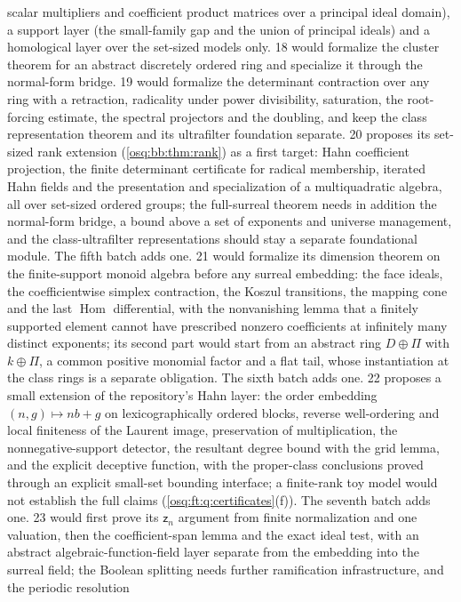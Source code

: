\documentclass[11pt,letterpaper]{article}
\numberwithin{equation}{section}
\theoremstyle{definition}
\theoremstyle{remark}
\theoremstyle{plain}
\newcommand{\Hom}{\operatorname{Hom}}
\begin{document}
scalar multipliers and coefficient product matrices over a principal ideal domain), a support layer (the small-family gap and the
union of principal ideals) and a homological layer over the set-sized models only. 18 would formalize the cluster theorem for an
abstract discretely ordered ring and specialize it through the normal-form bridge. 19 would formalize the determinant contraction over
any ring with a retraction, radicality under power divisibility, saturation, the root-forcing estimate, the spectral projectors and the
doubling, and keep the class representation theorem and its ultrafilter foundation separate. 20 proposes its set-sized rank extension
(\cref{osq:bb:thm:rank}) as a first target: Hahn coefficient projection, the finite determinant certificate for radical membership, iterated Hahn
fields and the presentation and specialization of a multiquadratic algebra, all over set-sized ordered groups; the full-surreal theorem needs
in addition the normal-form bridge, a bound above a set of exponents and universe management, and the class-ultrafilter representations
should stay a separate foundational module. The fifth batch adds one. 21 would formalize its dimension theorem on the finite-support monoid
algebra before any surreal embedding: the face ideals, the coefficientwise simplex contraction, the Koszul transitions, the mapping cone and
the last $\Hom$ differential, with the nonvanishing lemma that a finitely supported element cannot have prescribed nonzero coefficients at
infinitely many distinct exponents; its second part would start from an abstract ring $D\oplus\Pi$ with $k\oplus\Pi$, a common positive
monomial factor and a flat tail, whose instantiation at the class rings is a separate obligation. The sixth batch adds one. 22 proposes a small
extension of the repository's Hahn layer: the order embedding $(n,g)\mapsto nb+g$ on lexicographically ordered blocks, reverse well-ordering and local
finiteness of the Laurent image, preservation of multiplication, the nonnegative-support detector, the resultant degree bound with the grid lemma, and
the explicit deceptive function, with the proper-class conclusions proved through an explicit small-set bounding interface; a finite-rank toy model
would not establish the full claims (\cref{osq:ft:q:certificates}(f)). The seventh batch adds one. 23 would first prove its $\mathsf z_n$ argument from
finite normalization and one valuation, then the coefficient-span lemma and the exact ideal test, with an abstract algebraic-function-field layer
separate from the embedding into the surreal field; the Boolean splitting needs further ramification infrastructure, and the periodic resolution
\end{document}
